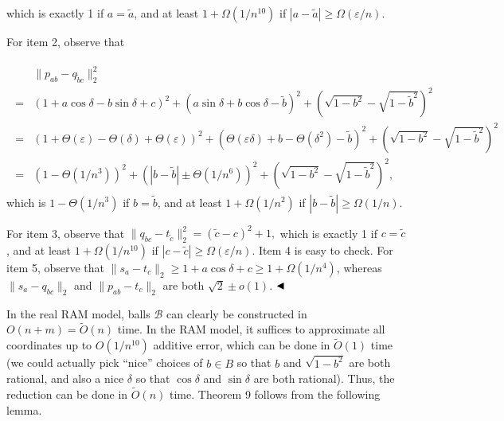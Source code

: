 which is exactly 1 if $a=\tilde{a}$, and at least $1+\Omega(1/n^{10})$ if $|a-\tilde{a}|\geq\Omega(\varepsilon/n)$.
\par
\par
For item 2, observe that
\par
\[\begin{aligned}
\begin{split}&\|p_{ab}-q_{\tilde{b}c}\|^{2}_{2}\\
=&(1+a\cos\delta-b\sin\delta+c)^{2}+(a\sin\delta+b\cos\delta-\tilde{b})^{2}+(%
\sqrt{1-b^{2}}-\sqrt{1-\tilde{b}^{2}})^{2}\\
=&(1+\Theta(\varepsilon)-\Theta(\delta)+\Theta(\varepsilon))^{2}+(\Theta(%
\varepsilon\delta)+b-\Theta(\delta^{2})-\tilde{b})^{2}+(\sqrt{1-b^{2}}-\sqrt{1%
-\tilde{b}^{2}})^{2}\\
=&(1-\Theta(1/n^{3}))^{2}+(|b-\tilde{b}|\pm\Theta(1/n^{6}))^{2}+(\sqrt{1-b^{2}%
}-\sqrt{1-\tilde{b}^{2}})^{2},\end{split}
\end{aligned}\]
which is $1-\Theta(1/n^{3})$ if $b=\tilde{b}$, and at least $1+\Omega(1/n^{2})$ if $|b-\tilde{b}|\geq\Omega(1/n)$.
\par
\par
For item 3, observe that $\|q_{bc}-t_{\tilde{c}}\|^{2}_{2}=(\tilde{c}-c)^{2}+1,$ which is exactly 1 if $c=\tilde{c}$, and at least $1+\Omega(1/n^{10})$ if $|c-\tilde{c}|\geq\Omega(\varepsilon/n)$. Item 4 is easy to check. For item 5, observe that $\|s_{a}-t_{c}\|_{2}\geq 1+a\cos\delta+c\geq 1+\Omega(1/n^{4})$, whereas $\|s_{a}-q_{bc}\|_{2}$ and $\|p_{ab}-t_{c}\|_{2}$ are both $\sqrt{2}\pm o(1)$. $\hfill\blacktriangleleft$
\par
\par
In the real RAM model, balls $\mathcal{B}$ can clearly be constructed in $O(n+m)=\tilde{O}(n)$ time. In the RAM model, it suffices to approximate all coordinates up to $O(1/n^{10})$ additive error, which can be done in $\tilde{O}(1)$ time (we could actually pick “nice” choices of $b\in B$ so that $b$ and $\sqrt{1-b^{2}}$ are both rational, and also a nice $\delta$ so that $\cos\delta$ and $\sin\delta$ are both rational). Thus, the reduction can be done in $\tilde{O}(n)$ time. Theorem 9 follows from the following lemma.
\par
\par
